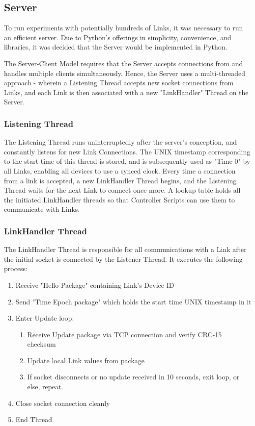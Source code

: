 \documentclass[letterpaper, 10 pt, conference]{ieeeconf}  %
\begin{document}
\subsection{Server}

To run experiments with potentially hundreds of Links, it was necessary to run an efficient server. Due to Python's offerings in simplicity, convenience, and libraries, it was decided that the Server would be implemented in Python.

The Server-Client Model requires that the Server accepts connections from and handles multiple clients simultaneously. Hence, the Server uses a multi-threaded approach - wherein a Listening Thread accepts new socket connections from Links, and each Link is then associated with a new "LinkHandler" Thread on the Server. 
\\
\subsubsection{Listening Thread}
The Listening Thread runs uninterruptedly after the server's conception, and constantly listens for new Link Connections. The UNIX timestamp corresponding to the start time of this thread is stored, and is subsequently used as "Time 0" by all Links, enabling all devices to use a synced clock. Every time a connection from a link is accepted, a new LinkHandler Thread begins, and the Listening Thread waits for the next Link to connect once more. A lookup table holds all the initiated LinkHandler threads so that Controller Scripts can use them to communicate with Links.
\\
\subsubsection{LinkHandler Thread}
The LinkHandler Thread is responsible for all communications with a Link after the initial socket is connected by the Listener Thread. It executes the following process:

\begin{enumerate}
    \item Receive "Hello Package" containing Link's Device ID
    \item Send "Time Epoch package" which holds the start time UNIX timestamp in it
    \item Enter Update loop:
    \begin{enumerate}
        \item Receive Update package via TCP connection and verify CRC-15 checksum
        \item Update local Link values from package
        \item If socket disconnects or no update received in 10 seconds, exit loop, or else, repeat.
    \end{enumerate}
    \item Close socket connection cleanly
    \item End Thread
\end{enumerate}
\end{document}
